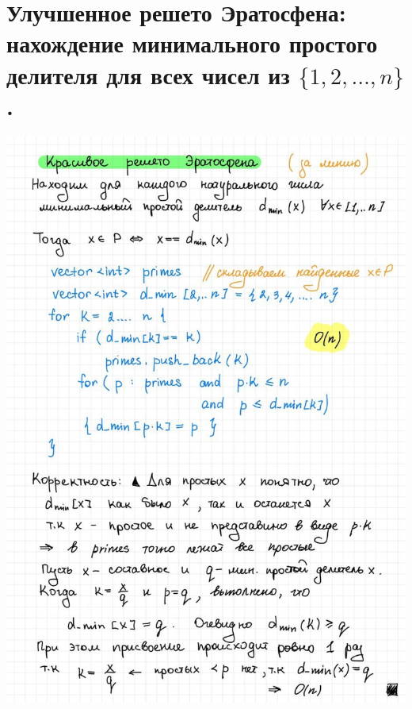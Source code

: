 \section{Улучшенное решето Эратосфена: нахождение минимального простого делителя для всех чисел из $\{1, 2, \ldots, n\}$.}
\includegraphics[width=1\linewidth]{images/Nice_sieve.jpg}

